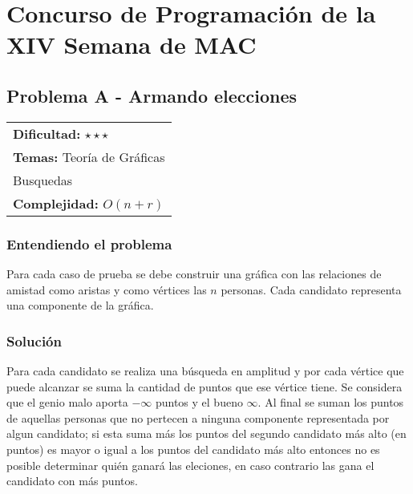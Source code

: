 \chapter{Concurso de Programación de la XIV Semana de MAC}

\section{Problema A - Armando elecciones}

\hfill
\begin{tabular}{@{}l@{}}
\textbf{Dificultad:} $\star\star\star$ \\
\textbf{Temas:} Teoría de Gráficas \\
Busquedas \\
\textbf{Complejidad:} $O(n+r)$
\end{tabular}

\subsection*{Entendiendo el problema}
Para cada caso de prueba se debe construir una gráfica con las relaciones de amistad como aristas y como vértices las $n$ personas. Cada candidato representa una componente de la gráfica. 
\subsection*{Solución}
Para cada candidato se realiza una búsqueda en amplitud y por cada vértice que puede alcanzar se suma la cantidad de puntos que ese vértice tiene. Se considera que el genio malo aporta $-\infty$ puntos y el bueno $\infty$. Al final se suman los puntos de aquellas personas que no pertecen a ninguna componente representada por algun candidato; si esta suma más los puntos del segundo candidato más alto (en puntos) es mayor o igual a los puntos del candidato más alto entonces no es posible determinar quién ganará las eleciones, en caso contrario las gana el candidato con más puntos.
